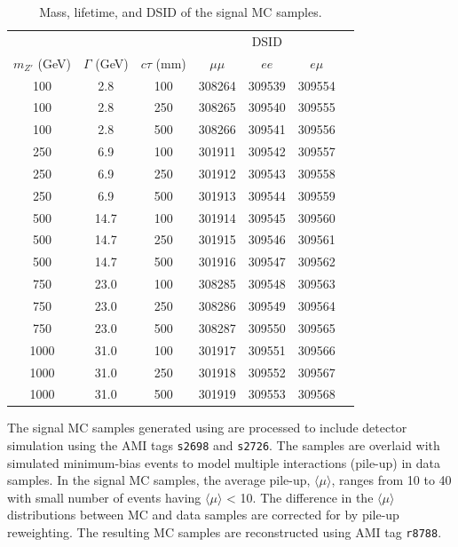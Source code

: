 \begin{table}[!htb]
  \centering
  \begin{tabular}{ c c c c c c c }
    \hline
    \hline
           &   &    & \multicolumn{3}{c}{DSID}                 \\
    $m_{Z'}$ (GeV) & $\Gamma$ (GeV) & $c\tau$ (mm) &$\mu\mu$ & $ee$ & $e\mu$ \\
    \hline
    100			   &	2.8         &   100	& 308264	& 309539		&	309554		\\
    100			   &	2.8         &   250	& 308265	& 309540		&	309555		\\
    100			   &	2.8         &   500	& 308266	& 309541		&	309556		\\
    250			   &   6.9	        &   100	& 301911	& 309542		&	309557		\\
    250			   &	6.9         &   250	& 301912	& 309543		&	309558		\\
    250			   &	6.9         &   500	& 301913	& 309544		&	309559		\\
    500			   &   14.7         &   100	& 301914	& 309545		&	309560		\\
    500			   &	14.7        &   250	& 301915	& 309546		&	309561		\\
    500			   &	14.7        &   500	& 301916	& 309547		&	309562		\\
    750			   &	23.0        &   100	& 308285	& 309548		&	309563		\\
    750			   &	23.0        &   250	& 308286	& 309549		&	309564		\\
    750			   &	23.0        &   500	& 308287	& 309550		&	309565		\\
    1000	       &	31.0        &   100	& 301917	& 309551		&	309566		\\
    1000	       &	31.0        &   250	& 301918	& 309552		&	309567		\\
    1000	       &	31.0        &   500	& 301919	& 309553		&	309568		\\
    \hline
    \hline
  \end{tabular}
  \caption{Mass, lifetime, and DSID of the signal MC samples.}
  \label{table:MC_signal_samples}
\end{table}

The signal MC samples generated using \pythia are processed to include detector simulation using the AMI tags \texttt{s2698} and \texttt{s2726}. The samples are overlaid with simulated minimum-bias events to model multiple interactions (pile-up) in data samples. In the signal MC samples, the average pile-up, $\langle\mu\rangle$, ranges from 10 to 40 with small number of events having $\langle\mu\rangle$ < 10. The difference in the $\langle\mu\rangle$ distributions between MC and data samples are corrected for by pile-up reweighting. The resulting MC samples are reconstructed using AMI tag \texttt{r8788}.

